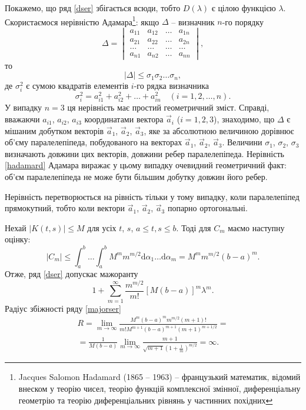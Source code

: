 \documentclass[14pt,twoside]{extreport}
\theoremstyle{mystyle}
\numberwithin{equation}{chapter}
\begin{document}
Покажемо, що ряд \eqref{dser} збігається всюди, тобто $D(\lambda)$ є цілою функцією $\lambda$. Скористаємося нерівністю Адамара\footnote{Jacques Salomon Hadamard (1865 -- 1963) -- французький математик, відомий внеском у теорію чисел, теорію функцій комплексної змінної, диференціальну геометрію та теорію диференціальних рівнянь у частинних похідних}: якщо $\Delta$ -- визначник $n$-го порядку
\[
\Delta=
\begin{vmatrix}
a_{11} & a_{12} & \ldots & a_{1n}\\
a_{21} & a_{22} & \ldots & a_{2n}\\
\ldots & \ldots & \ldots & \ldots\\
a_{n1} & a_{n2} & \ldots & a_{nn}
\end{vmatrix},
\]
то
\begin{equation}\label{hadamard}
 |\Delta|\leqslant \sigma_1\sigma_2\ldots\sigma_n,
\end{equation}
де $\sigma_i^2$ є сумою квадратів елементів $i$-го рядка визначника
\[
 \sigma_i^2 = a_{i1}^2 + a_{i2}^2 + \ldots + a_{in}^2 \quad (i = 1, 2, \ldots, n).
\]
У випадку $n = 3$ ця нерівність має простий геометричний зміст. Справді, вважаючи $a_{i1}$, $a_{i2}$, $a_{i3}$ координатами вектора $\vec{a}_i$ ($i = 1, 2, 3$), знаходимо, що $\Delta$ є мішаним добутком векторів $\vec{a}_1$, $\vec{a}_2$, $\vec{a}_3$, яке за абсолютною величиною дорівнює об'єму паралелепіпеда, побудованого на векторах $\vec{a}_1$, $\vec{a}_2$, $\vec{a}_3$. Величини $\sigma_1$, $\sigma_2$, $\sigma_3$ визначають довжини цих векторів, довжини ребер паралелепіпеда. Нерівність \eqref{hadamard} Адамара виражає у цьому випадку очевидний геометричний факт: об'єм паралелепіпеда не може бути більшим добутку довжин його ребер.

Нерівність перетворюється на рівність тільки у тому випадку, коли паралелепіпед прямокутний, тобто коли вектори $\vec{a}_1$, $\vec{a}_2$, $\vec{a}_3$ попарно ортогональні.

Нехай $|K(t, s)|\leqslant M$ для усіх $t$, $s$, $a\leqslant t, s \leqslant b$. Тоді для $C_m$ маємо наступну оцінку:
\[
 |C_{m}|\leqslant \int_{a}^{b}\ldots\int_{a}^{b} M^{m}m^{m/2}\mathrm{d}\alpha_{1}\ldots \mathrm{d}\alpha_{m}=M^{m}m^{m/2}(b-a)^{m}.
\]
Отже, ряд \eqref{dser} допускає мажоранту
\begin{equation}\label{majorser}
 1+\displaystyle \sum\limits_{m=1}^{\infty}\frac{m^{m/2}}{m!}[M(b-a)]^{m}\lambda^{m}.
\end{equation}
Радіус збіжності ряду \eqref{majorser}
\begin{multline*}
  R=\displaystyle \lim_{m\to\infty}\frac{M^{m}(b-a)^{m}m^{m/2}(m+1)!}{m!M^{m+1}(b-a)^{m+1}(m+1)^{m+1/2}}=\\
  =\displaystyle\frac{1}{M(b-a)}\lim\limits_{m\to\infty}\frac{m+1}{\sqrt{m+1}\left(1+\frac{1}{m}\right)^{m/2}}=\infty.
\end{multline*}
\end{document}
